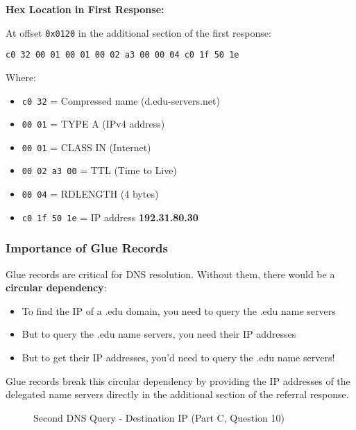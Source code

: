 \documentclass[11pt,letterpaper]{article}
\begin{document}
\textbf{Hex Location in First Response:}

At offset \texttt{0x0120} in the additional section of the first response:
\begin{hexbox}
\begin{lstlisting}[style=hexstyle]
c0 32 00 01 00 01 00 02 a3 00 00 04 c0 1f 50 1e
\end{lstlisting}
\end{hexbox}

Where:
\begin{itemize}
    \item \texttt{c0 32} = Compressed name (d.edu-servers.net)
    \item \texttt{00 01} = TYPE A (IPv4 address)
    \item \texttt{00 01} = CLASS IN (Internet)
    \item \texttt{00 02 a3 00} = TTL (Time to Live)
    \item \texttt{00 04} = RDLENGTH (4 bytes)
    \item \texttt{c0 1f 50 1e} = IP address \textbf{192.31.80.30}
\end{itemize}

\subsubsection{Importance of Glue Records}

Glue records are critical for DNS resolution. Without them, there would be a \textbf{circular dependency}:
\begin{itemize}
    \item To find the IP of a .edu domain, you need to query the .edu name servers
    \item But to query the .edu name servers, you need their IP addresses
    \item But to get their IP addresses, you'd need to query the .edu name servers!
\end{itemize}

Glue records break this circular dependency by providing the IP addresses of the delegated name servers directly in the additional section of the referral response.

\begin{figure}[h]
    \centering
    \caption{Second DNS Query - Destination IP (Part C, Question 10)}
    \label{fig:partc_q10a}
\end{figure}
\end{document}
